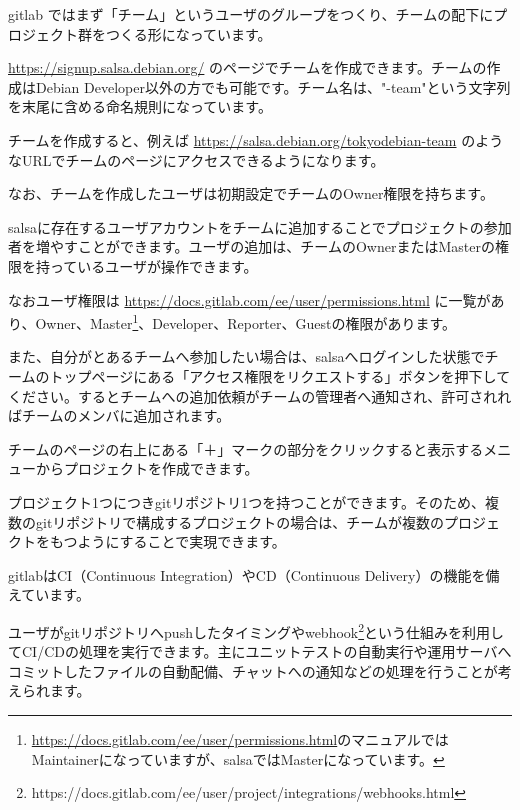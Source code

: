 \documentclass[mingoth,a4paper]{jsarticle}
\begin{document}

gitlab ではまず「チーム」というユーザのグループをつくり、チームの配下にプロジェクト群をつくる形になっています。

\url{https://signup.salsa.debian.org/} のページでチームを作成できます。チームの作成はDebian Developer以外の方でも可能です。チーム名は、"-team"という文字列を末尾に含める命名規則になっています。

チームを作成すると、例えば \url{https://salsa.debian.org/tokyodebian-team} のようなURLでチームのページにアクセスできるようになります。

なお、チームを作成したユーザは初期設定でチームのOwner権限を持ちます。



salsaに存在するユーザアカウントをチームに追加することでプロジェクトの参加者を増やすことができます。ユーザの追加は、チームのOwnerまたはMasterの権限を持っているユーザが操作できます。

なおユーザ権限は \url{https://docs.gitlab.com/ee/user/permissions.html} に一覧があり、Owner、Master\footnote{\url{https://docs.gitlab.com/ee/user/permissions.html}のマニュアルではMaintainerになっていますが、salsaではMasterになっています。}、Developer、Reporter、Guestの権限があります。

また、自分がとあるチームへ参加したい場合は、salsaへログインした状態でチームのトップページにある「アクセス権限をリクエストする」ボタンを押下してください。するとチームへの追加依頼がチームの管理者へ通知され、許可されればチームのメンバに追加されます。



チームのページの右上にある「＋」マークの部分をクリックすると表示するメニューからプロジェクトを作成できます。

プロジェクト1つにつきgitリポジトリ1つを持つことができます。そのため、複数のgitリポジトリで構成するプロジェクトの場合は、チームが複数のプロジェクトをもつようにすることで実現できます。



gitlabはCI（Continuous Integration）やCD（Continuous Delivery）の機能を備えています。


ユーザがgitリポジトリへpushしたタイミングやwebhook\footnote{https://docs.gitlab.com/ee/user/project/integrations/webhooks.html}という仕組みを利用してCI/CDの処理を実行できます。主にユニットテストの自動実行や運用サーバへコミットしたファイルの自動配備、チャットへの通知などの処理を行うことが考えられます。
\end{document}
